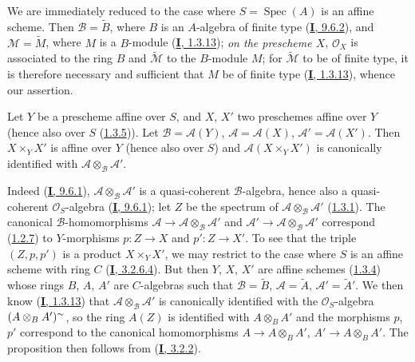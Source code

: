 We are immediately reduced to the case where $S=\operatorname{Spec}(A)$ is
an affine scheme. Then $\mathcal{B}=\widetilde{B}$, where $B$ is an
$A$-algebra of finite type (\hyperref[I.9.6.2]{\textbf{I}, 9.6.2}), and
$\mathcal{M}=\widetilde{M}$, where $M$ is a $B$-module
(\hyperref[I.1.3.13]{\textbf{I}, 1.3.13}); \emph{on the prescheme $X$},
$\mathcal{O}_X$ is associated to the ring $B$ and
$\widetilde{\mathcal{M}}$ to the $B$-module $M$; for
$\widetilde{\mathcal{M}}$ to be of finite type, it is therefore necessary
and sufficient that $M$ be of finite type
(\hyperref[I.1.3.13]{\textbf{I}, 1.3.13}), whence our assertion.

\begin{proposition}[1.4.6]
\label{II.1.4.6}
Let $Y$ be a prescheme affine over $S$, and $X$, $X'$ two preschemes
affine over $Y$ \textup{(hence also over $S$
(\hyperref[II.1.3.5]{1.3.5}))}. Let
$\mathcal{B}=\mathcal{A}(Y)$, $\mathcal{A}=\mathcal{A}(X)$,
$\mathcal{A}'=\mathcal{A}(X')$. Then $X\times_Y X'$ is affine over
$Y$ \textup{(hence also over $S$)} and $\mathcal{A}(X\times_Y X')$
is canonically identified with $\mathcal{A}\otimes_{\mathcal{B}}\mathcal{A}'$.
\end{proposition}

Indeed (\hyperref[I.9.6.1]{\textbf{I}, 9.6.1}),
$\mathcal{A}\otimes_{\mathcal{B}}\mathcal{A}'$ is a quasi-coherent
$\mathcal{B}$-algebra, hence also a quasi-coherent
$\mathcal{O}_S$-algebra
(\hyperref[I.9.6.1]{\textbf{I}, 9.6.1}); let $Z$ be the spectrum of
$\mathcal{A}\otimes_{\mathcal{B}}\mathcal{A}'$
(\hyperref[II.1.3.1]{1.3.1}). The canonical $\mathcal{B}$-homomorphisms
$\mathcal{A}\to\mathcal{A}\otimes_{\mathcal{B}}\mathcal{A}'$ and
$\mathcal{A}'\to\mathcal{A}\otimes_{\mathcal{B}}\mathcal{A}'$ correspond
(\hyperref[II.1.2.7]{1.2.7}) to $Y$-morphisms $p:Z\to X$ and
$p':Z\to X'$. To see that the triple $(Z,p,p')$ is a product
$X\times_Y X'$, we may restrict to the case where $S$ is an affine scheme
with ring $C$ (\hyperref[I.3.2.6.4]{\textbf{I}, 3.2.6.4}). But then $Y$, $X$,
$X'$ are affine schemes (\hyperref[II.1.3.4]{1.3.4}) whose
rings $B$, $A$, $A'$ are $C$-algebras such that
$\mathcal{B}=\widetilde{B}$, $\mathcal{A}=\widetilde{A}$,
$\mathcal{A}'=\widetilde{A}'$. We then know
(\hyperref[I.1.3.13]{\textbf{I}, 1.3.13}) that
$\mathcal{A}\otimes_{\mathcal{B}}\mathcal{A}'$ is canonically identified
with the $\mathcal{O}_S$-algebra $(A\otimes_B A')^{\sim}$, so the ring
$A(Z)$ is identified with $A\otimes_B A'$ and the morphisms $p$, $p'$
correspond to the canonical homomorphisms $A\to A\otimes_B A'$,
$A'\to A\otimes_B A'$. The proposition then follows from
(\hyperref[I.3.2.2]{\textbf{I}, 3.2.2}).

